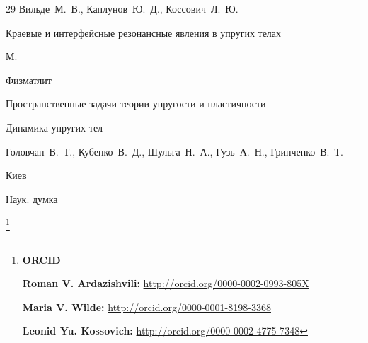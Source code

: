 \begin{thebibliography}{29}
\by Вильде~М.~В., Каплунов~Ю.~Д., Коссович~Л.~Ю.

\book Краевые и интерфейсные резонансные явления в упругих телах

\publaddr М.

\publ Физматлит






\paper Пространственные задачи теории упругости и пластичности 

\inbook Динамика упругих тел


\by  Головчан~В.~Т., Кубенко~В.~Д., Шульга~Н.~А., Гузь~А.~Н., Гринченко~В.~Т.


\publaddr Киев

\publ Наук. думка




\end{thebibliography}





\RuDate



\bigskip



\makeentitle



\thanks{{\bf ORCID}



{\bf Roman V. Ardazishvili:} \url{http://orcid.org/0000-0002-0993-805X}



{\bf Maria V. Wilde:} \url{http://orcid.org/0000-0001-8198-3368}



{\bf Leonid Yu. Kossovich:} \url{http://orcid.org/0000-0002-4775-7348}



}





\EngRef







